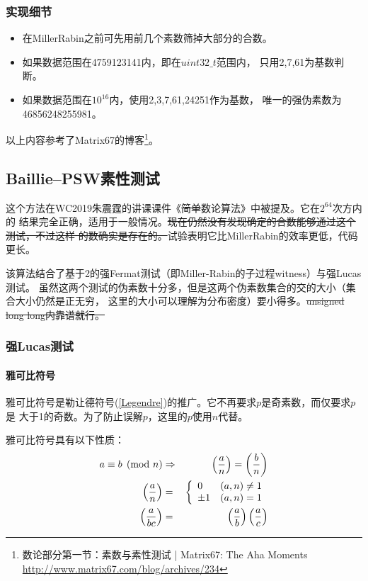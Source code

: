 \subsubsection{实现细节}
\begin{itemize}
    \item 在MillerRabin之前可先用前几个素数筛掉大部分的合数。
    \item 如果数据范围在4759123141内，即在$uint32\_t$范围内，
    只用2,7,61为基数判断。
    \item 如果数据范围在$10^{16}$内，使用2,3,7,61,24251作为基数，
    唯一的强伪素数为46856248255981。
\end{itemize}

以上内容参考了Matrix67的博客\footnote{
	数论部分第一节：素数与素性测试 | Matrix67: The Aha Moments
	\url{http://www.matrix67.com/blog/archives/234}}。
\subsection{Baillie–PSW素性测试}
这个方法在WC2019朱震霆的讲课课件《\sout{简单}数论算法》中被提及。它在$2^64$次方内的
结果完全正确，适用于一般情况。\sout{现在仍然没有发现确定的合数能够通过这个测试，不过这样
的数确实是存在的。}试验表明它比MillerRabin的效率更低，代码更长。

该算法结合了基于2的强Fermat测试（即Miller-Rabin的子过程witness）与强Lucas测试。
虽然这两个测试的伪素数十分多，但是这两个伪素数集合的交的大小（集合大小仍然是正无穷，
这里的大小可以理解为分布密度）要小得多。\sout{unsigned long long内靠谱就行。}

\subsubsection{强Lucas测试}
\paragraph{雅可比符号}
雅可比符号是勒让德符号(\ref{Legendre})的推广。它不再要求$p$是奇素数，而仅要求$p$是
大于1的奇数。为了防止误解$p$，这里的$p$使用$n$代替。

雅可比符号具有以下性质：
\begin{eqnarray}
    a\equiv b\pmod{n}&\Rightarrow& \left(\frac{a}{n}\right)=\left(\frac{b}{n}\right)\label{JSR1}\\
    \left(\frac{a}{n}\right)&=&\left\{
    \begin{array}{lr}
        0&(a,n)\neq 1\\
        \pm 1&(a,n)=1
    \end{array}
    \right.\label{JSR2}\\
    \left(\frac{a}{bc}\right)&=&\left(\frac{a}{b}\right)\left(\frac{a}{c}\right)\label{JSR3}\\
\end{eqnarray}

